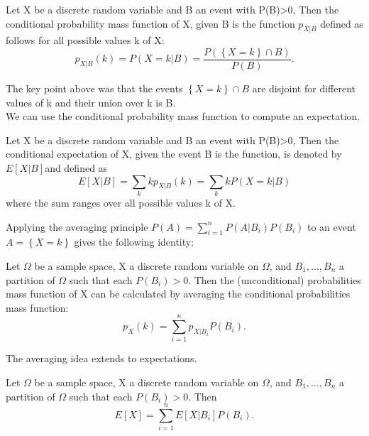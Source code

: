 \documentclass{tufte-handout}
\begin{document}
    \begin{Definition}
        Let X be a discrete random variable and B an event with P(B)>0, Then the conditional
        probability mass function of X, given B is the function $ p_{X|B } $ defined as follows for all
        possible values k of X:
        \[p_{X|B}(k)=P(X=k|B)=\frac{P(\left\{ X = k \right\}\cap B)}{P(B)}.\]
    \end{Definition}
    
    The key point above was that the events $ \left\{ X = k \right\} \cap B$ are disjoint for different 
    values of k and their union over k is B.\\
    We can use the conditional probability mass function to compute an expectation.
    
    \begin{Definition}
        Let X be a discrete random variable and B an event with P(B)>0, Then the conditional
        expectation of X, given the event B is the function, is denoted by $ E[X|B ] $and defined as
        \[E[X|B]=\sum_k k p_{X|B }(k) = \sum_k k P(X=k|B)\]
        where the sum ranges over all possible values k of X.
    \end{Definition}
    
    Applying the averaging principle $ P(A)=\sum_{i=1}^{n}P(A|B_i)P(B_i) $ to an event $ A = \left\{ X=k \right\} $ gives
    the following identity:
    
    \begin{Theorem}
        Let $ \Omega $ be a sample space, X a discrete random variable on $ \Omega $, and $ B_1, \dots, B_n  $
        a partition of $ \Omega $ such that each $ P(B_i)>0 $. Then the (unconditional) 
        probabilities mass function of X can be calculated by averaging the conditional
        probabilities mass function:
        \[p_X(k) = \sum_{i=1}^{n }p_{X|B_i }P(B_i ).\]
    \end{Theorem}

    The averaging idea extends to expectations.
    \begin{Theorem}
        Let $ \Omega $ be a sample space, X a discrete random variable on $ \Omega $, and $ B_1, \dots, B_n  $
        a partition of $ \Omega $ such that each $ P(B_i )>0 $. Then
        \[E[X]=\sum_{i=1}^{n }E[X|B_i]P(B_i).\]
    \end{Theorem}
\end{document}
